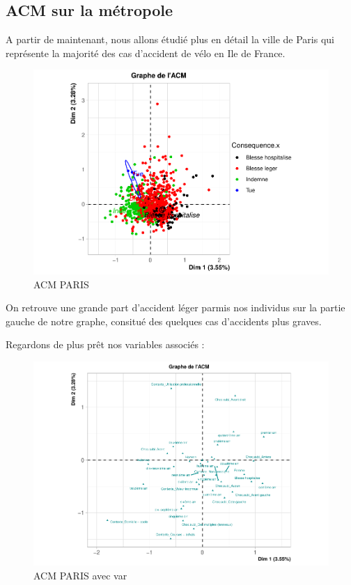 \documentclass[french,]{compterendu}
\theoremstyle{urcastyle}
\theoremstyle{remark}
\begin{document}
\hypertarget{acm-sur-la-muxe9tropole}{%
\subsection{ACM sur la métropole}\label{acm-sur-la-muxe9tropole}}

A partir de maintenant, nous allons étudié plus en détail la ville de Paris qui représente la majorité des cas d'accident de vélo en Ile de France.

\begin{figure}[H]

{\centering \includegraphics[width=0.9\linewidth]{Rapport_ADD_LEO-GABET_files/figure-latex/acmPARIS1-1} 

}

\caption{ACM PARIS}\label{fig:acmPARIS1}
\end{figure}

On retrouve une grande part d'accident léger parmis nos individus sur la partie gauche de notre graphe, consitué des quelques cas d'accidents plus graves.

Regardons de plus prêt nos variables associés :

\begin{figure}[H]

{\centering \includegraphics[width=0.9\linewidth]{Rapport_ADD_LEO-GABET_files/figure-latex/acmPARIS-1} 

}

\caption{ACM PARIS avec var}\label{fig:acmPARIS}
\end{figure}
\end{document}
